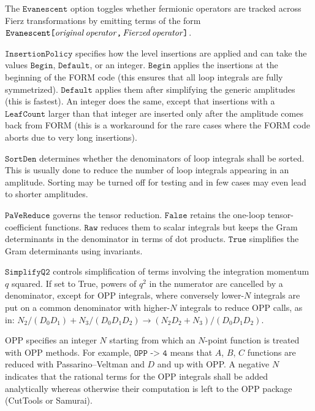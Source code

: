 \documentclass[twoside,11pt]{article}
\def\Var#1{\ensuremath{\mathit{#1}}}
\def\Code#1{\ensuremath{\texttt{#1}}}
\begin{document}
The \Code{Evanescent} option toggles whether fermionic operators are 
tracked across Fierz transformations by emitting terms of the form 
\Code{Evanescent[\Var{original\,operator},\,\Var{Fierzed\,operator}]}.

%
%
%
\Code{InsertionPolicy} specifies how the level insertions are applied
and can take the values \Code{Begin}, \Code{Default}, or an integer. 
\Code{Begin} applies the insertions at the beginning of the FORM code
(this ensures that all loop integrals are fully symmetrized).  
\Code{Default} applies them after simplifying the generic amplitudes
(this is fastest).  An integer does the same, except that insertions
with a \Code{LeafCount} larger than that integer are inserted only 
after the amplitude comes back from FORM (this is a workaround for
the rare cases where the FORM code aborts due to very long insertions).

\Code{SortDen} determines whether the denominators of loop integrals
shall be sorted.  This is usually done to reduce the number of loop
integrals appearing in an amplitude.  Sorting may be turned off for
testing and in few cases may even lead to shorter amplitudes.

\Code{PaVeReduce} governs the tensor reduction.  \Code{False} retains
the one-loop tensor-coefficient functions.  \Code{Raw} reduces them
to scalar integrals but keeps the Gram determinants in the denominator
in terms of dot products.  \Code{True} simplifies the Gram determinants
using invariants.

\Code{SimplifyQ2} controls simplification of terms involving the
integration momentum $q$ squared.  If set to True, powers of $q^2$ in 
the numerator are cancelled by a denominator, except for OPP integrals,
where conversely lower-$N$ integrals are put on a common denominator
with higher-$N$ integrals to reduce OPP calls, as in:
$N_2/(D_0 D_1) + N_3/(D_0 D_1 D_2) \to (N_2 D_2 + N_3)/(D_0 D_1 D_2)$.

%
%
%
%
%
%
OPP specifies an integer $N$ starting from which an $N$-point function is 
treated with OPP methods.  For example, \Code{OPP -> 4} means that $A$, 
$B$, $C$ functions are reduced with Passarino--Veltman and $D$ and up with 
OPP.  A negative $N$ indicates that the rational terms for the OPP 
integrals shall be added analytically whereas otherwise their computation 
is left to the OPP package (CutTools or Samurai).
\end{document}
